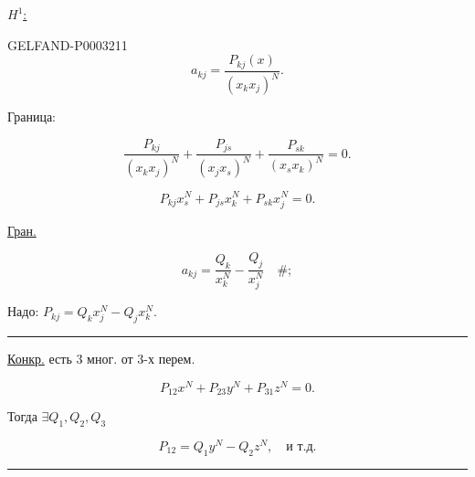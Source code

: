 \hfill{}

\uline{\uline{$H^1$:}}

\begin{GelfandAdjacentEvidence}{GELFAND-P000321}{1}
\begin{equation*}a_{kj}=\frac{P_{kj}(x)}{(x_k x_j)^N}.\end{equation*}

\end{GelfandAdjacentEvidence}


Граница:

\begin{equation*}\frac{P_{kj}}{(x_k x_j)^N}+\frac{P_{js}}{(x_j x_s)^N}+\frac{P_{sk}}{(x_s x_k)^N}=0.\end{equation*}

\begin{equation*}\boxed{P_{kj}x_s^N+P_{js}x_k^N+P_{sk}x_j^N=0}.\end{equation*}

\uline{Гран.}

\begin{equation*}a_{kj}=\frac{Q_k}{x_k^N}-\frac{Q_j}{x_j^N}\quad\#;\end{equation*}

Надо: $P_{kj}=Q_k x_j^N-Q_j x_k^N$.

\begin{center}\rule{.9\linewidth}{.3pt}\end{center}

\uline{Конкр.} есть $3$ мног. от $3$-х перем.

\begin{equation*}P_{12}x^N+P_{23}y^N+P_{31}z^N=0.\end{equation*}

Тогда $\exists Q_1,Q_2,Q_3$

\begin{equation*}P_{12}=Q_1 y^N-Q_2 z^N,\quad\text{и т.д.}\end{equation*}

\begin{center}\rule{.9\linewidth}{.3pt}\end{center}

